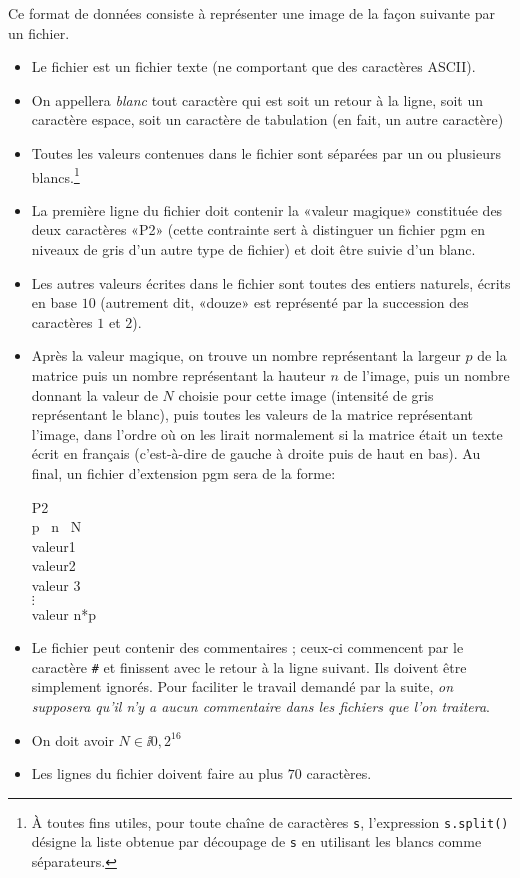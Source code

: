 Ce format de données consiste à représenter une image de la façon
suivante par un fichier.
\begin{itemize}
	\item[\textbullet] Le fichier est un fichier texte (ne comportant que des
	caractères ASCII).
	\item[\textbullet] On appellera \emph{blanc} tout caractère qui est soit un retour à la
	ligne, soit un caractère espace, soit un caractère de tabulation (en
	fait, un autre caractère)
	\item[\textbullet] Toutes les valeurs contenues dans le fichier sont séparées par
	un ou plusieurs blancs.\footnote{À toutes fins utiles, pour toute
		chaîne de caractères \texttt{s}, l'expression \texttt{s.split()} désigne
		la liste obtenue par découpage de \texttt{s} en utilisant les blancs
		comme séparateurs.}
	\item[\textbullet] La première ligne du fichier doit contenir la «valeur magique»
	constituée des deux caractères «P2» (cette contrainte sert à
	distinguer un fichier pgm en niveaux de gris d'un autre type de fichier) et doit être
	suivie d'un blanc.
	\item[\textbullet] Les autres valeurs écrites dans le fichier sont toutes des
	entiers naturels, écrits en base $10$ (autrement
	dit, «douze» est représenté par la succession des caractères $1$ et $2$).
	\item[\textbullet] Après  la valeur  magique, on trouve  un nombre  représentant la
	largeur $p$ de la matrice puis un nombre représentant la hauteur $n$
	de l'image,  puis un  nombre donnant la  valeur de $N$  choisie pour
	cette image  (intensité de gris représentant le  blanc), puis toutes
	les valeurs de  la matrice représentant l'image, dans  l'ordre où on
	les  lirait  normalement si  la  matrice  était  un texte  écrit  en
	français (c'est-à-dire de gauche à droite puis de haut en bas).
	\medskip Au final, un fichier d'extension pgm sera de la forme:
			
			P2\\	
			p \ n \ N \\	
			valeur1 \\ 
			valeur2\\
			valeur 3\\
			$\vdots$\\
			valeur n*p
	
\medskip 	
	\item[\textbullet] Le fichier peut contenir des commentaires ; ceux-ci commencent par le
	caractère \texttt{\#} et finissent avec le retour à la ligne
	suivant. Ils doivent être simplement ignorés. Pour faciliter le
	travail demandé par la suite, \emph{on supposera qu'il n'y a aucun
		commentaire dans les fichiers que l'on
		traitera}.
	\item[\textbullet] On doit avoir $N\in\ii{0, 2^{16}}$
	\item[\textbullet] Les lignes du fichier doivent faire au plus $70$ caractères.
\end{itemize}

